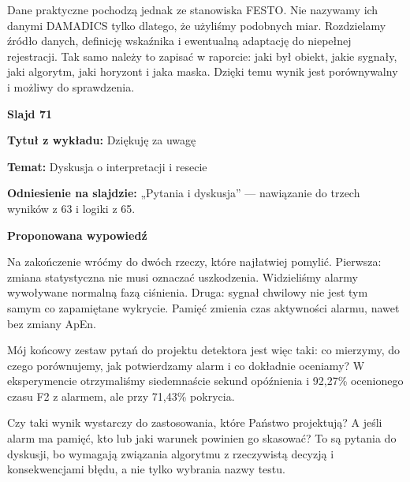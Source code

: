 \documentclass[a4paper,11pt]{article}
\newcommand{\NumerSlajdu}{1}
\newcommand{\Komentarz}[3]{%
  \gdef\NumerSlajdu{#1}%
  {\Large\bfseries Slajd #1\par}\smallskip
  \textbf{Tytuł z wykładu:} #2\par
  \textbf{Temat:} #3\par\medskip
}
\begin{document}
Dane praktyczne pochodzą jednak ze stanowiska FESTO. Nie nazywamy ich danymi DAMADICS tylko dlatego, że użyliśmy podobnych miar. Rozdzielamy źródło danych, definicję wskaźnika i ewentualną adaptację do niepełnej rejestracji. Tak samo należy to zapisać w raporcie: jaki był obiekt, jakie sygnały, jaki algorytm, jaki horyzont i jaka maska. Dzięki temu wynik jest porównywalny i możliwy do sprawdzenia.
\clearpage

\Komentarz{71}{Dziękuję za uwagę}{Dyskusja o interpretacji i resecie}
{\small\color{black!65}\textbf{Odniesienie na slajdzie:} „Pytania i dyskusja” — nawiązanie do trzech wyników z 63 i logiki z 65.\par}
\medskip
\textbf{Proponowana wypowiedź}\par
Na zakończenie wróćmy do dwóch rzeczy, które najłatwiej pomylić. Pierwsza: zmiana statystyczna nie musi oznaczać uszkodzenia. Widzieliśmy alarmy wywoływane normalną fazą ciśnienia. Druga: sygnał chwilowy nie jest tym samym co zapamiętane wykrycie. Pamięć zmienia czas aktywności alarmu, nawet bez zmiany ApEn.

Mój końcowy zestaw pytań do projektu detektora jest więc taki: co mierzymy, do czego porównujemy, jak potwierdzamy alarm i co dokładnie oceniamy? W eksperymencie otrzymaliśmy siedemnaście sekund opóźnienia i 92,27\% ocenionego czasu F2 z alarmem, ale przy 71,43\% pokrycia.

Czy taki wynik wystarczy do zastosowania, które Państwo projektują? A jeśli alarm ma pamięć, kto lub jaki warunek powinien go skasować? To są pytania do dyskusji, bo wymagają związania algorytmu z rzeczywistą decyzją i konsekwencjami błędu, a nie tylko wybrania nazwy testu.
\end{document}
